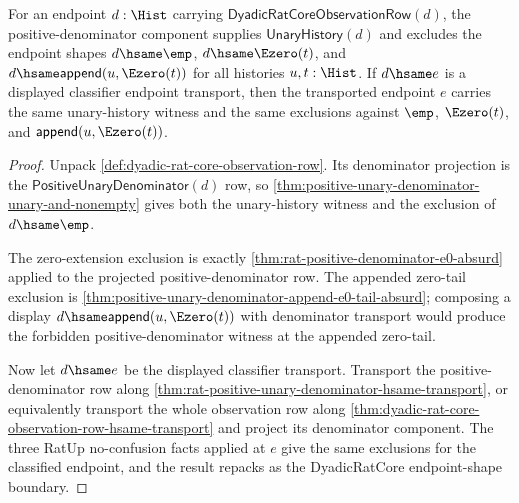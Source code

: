 \begin{theorem}
\label{thm:dyadic-rat-core-positive-denominator-no-confusion-boundary}
For an endpoint $d:\Hist$ carrying
$\mathsf{DyadicRatCoreObservationRow}(d)$, the positive-denominator component
supplies $\mathsf{UnaryHistory}(d)$ and excludes the endpoint shapes
$d\hsame\emp$, $d\hsame\Ezero(t)$, and
$d\hsame\mathsf{append}(u,\Ezero(t))$ for all histories $u,t:\Hist$.
If $d\hsame e$ is a displayed classifier endpoint transport, then the
transported endpoint $e$ carries the same unary-history witness and the same
exclusions against $\emp$, $\Ezero(t)$, and
$\mathsf{append}(u,\Ezero(t))$.
\end{theorem}
\begin{proof}
Unpack \autoref{def:dyadic-rat-core-observation-row}. Its denominator
projection is the $\mathsf{PositiveUnaryDenominator}(d)$ row, so
\autoref{thm:positive-unary-denominator-unary-and-nonempty} gives both the
unary-history witness and the exclusion of $d\hsame\emp$.

The zero-extension exclusion is exactly
\autoref{thm:rat-positive-denominator-e0-absurd} applied to the projected
positive-denominator row. The appended zero-tail exclusion is
\autoref{thm:positive-unary-denominator-append-e0-tail-absurd}; composing a
display $d\hsame\mathsf{append}(u,\Ezero(t))$ with denominator transport would
produce the forbidden positive-denominator witness at the appended zero-tail.

Now let $d\hsame e$ be the displayed classifier transport. Transport the
positive-denominator row along
\autoref{thm:rat-positive-unary-denominator-hsame-transport}, or equivalently
transport the whole observation row along
\autoref{thm:dyadic-rat-core-observation-row-hsame-transport} and project its
denominator component. The three RatUp no-confusion facts applied at $e$
give the same exclusions for the classified endpoint, and the result repacks
as the DyadicRatCore endpoint-shape boundary.
\end{proof}

